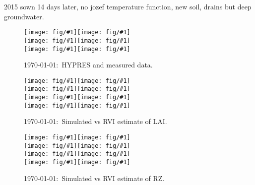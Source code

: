 \documentclass[a4paper]{article}
\newcommand{\figl}{\hspace*{-2cm}}
\newcommand{\figright}[1]{\texttt{[image: fig/\#1]}}
\newcommand{\fig}[1]{\figl\figright{#1}}
\newcommand{\MyID}{\today:~}
\begin{document}

2015 sown 14 days later, no jozef temperature function, new soil,
drains but deep groundwater.

\begin{figure}[htbp] 
  \fig{H0-25-Theta}\figright{H0-25-K}\\
  \fig{H25-50-Theta}\figright{H25-50-K}\\
  \fig{H50-100-Theta}\figright{H50-100-K}
  \caption{\MyID{}HYPRES and measured data.}
\end{figure}

\begin{figure}[htbp] 
  \fig{LAI}\figright{LAI-2010}\\
  \fig{LAI-2011}\figright{LAI-2012}\\
  \fig{LAI-2013}\figright{LAI-2014}\\
  \fig{LAI-2015}\figright{LAI-2016}
  \caption{\MyID{}Simulated vs RVI estimate of LAI.}
\end{figure}

\begin{figure}[htbp] 
  \fig{RZ}\figright{RZ-2010}\\
  \fig{RZ-2011}\figright{RZ-2012}\\
  \fig{RZ-2013}\figright{RZ-2014}\\
  \fig{RZ-2015}\figright{RZ-2016}
  \caption{\MyID{}Simulated vs RVI estimate of RZ.}
\end{figure}
\end{document}
